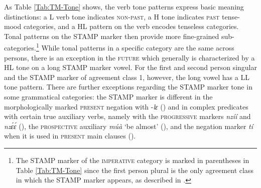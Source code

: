 As Table \ref{Tab:TM-Tone} shows, the verb tone patterns express  basic meaning distinctions: a L verb tone indicates \textsc{non-past}, a H tone indicates \textsc{past} tense-mood categories, and a HL pattern on the verb encodes tenseless categories. Tonal patterns on the STAMP marker then provide more fine-grained sub-categories.\footnote{The STAMP marker of the \textsc{imperative} category is marked in parentheses in Table \ref{Tab:TM-Tone} since the first person plural is the only agreement class in which the STAMP marker appears, as described in .} While tonal patterns in a specific category are the same across persons, there is an exception in the \textsc{future} which generally is characterized by a HL tone on a long STAMP marker vowel. For the first and second person singular and the STAMP marker of agreement class 1, however, the long vowel has a LL tone pattern. There are further exceptions regarding the STAMP marker tone in some grammatical categories: the STAMP marker is different in the morphologically marked \textsc{present} negation with -{\itshape lɛ} () and in complex predicates with certain true auxiliary verbs, namely with the \textsc{progressive} markers {\itshape nzíí} and {\itshape nzɛ́ɛ́} (), the \textsc{prospective} auxiliary {\itshape múà} `be almost' (), and the negation marker {\itshape tí} when it is used in \textsc{present} main clauses ().


\begin{table}[!h]
\centering
{}
\caption{Tonal patterns of tense-mood categories}
\label{Tab:TM-Tone}
\end{table}

